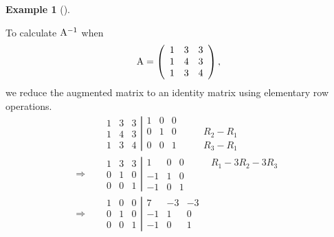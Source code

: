 \documentclass[
  a4paper,
  DIV=11,
  numbers=noendperiod,
  oneside]{scrreprt}
\theoremstyle{definition}
\newtheorem{example}{Example}[chapter]
\theoremstyle{remark}
\begin{document}
\begin{example}[]\protect\hypertarget{exm-inv}{}\label{exm-inv}

To calculate \({\rm A}^{-1}\) when \[{\rm A} =\left( \begin{array}{rrr}
 1  & 3  & 3  \\
 1  & 4  & 3  \\
 1  & 3  & 4  
\end{array} \right),\] we reduce the augmented matrix to an identity
matrix using elementary row operations. \[\begin{aligned}
& \left. \begin{array}{rrr}
 1  & 3  & 3  \\
 1  & 4  & 3  \\
 1  & 3 & 4  
\end{array}  \right| \begin{array}{rrrr}
 1  & 0  & 0  & \qquad  \\
 0  & 1  & 0  & \qquad R_{2} - R_{1}\\
 0  & 0  & 1  & \qquad R_{3} - R_{1}
\end{array} \\
\Rightarrow \quad  &\left. \begin{array}{rrr}
 1  & 3  & 3  \\
 0  & 1  & 0  \\
 0 & 0 & 1 
\end{array}  \right| \begin{array}{rrrr}
 1  & 0  & 0  & \qquad R_{1} - 3 R_{2}- 3R_{3}\\
 -1  & 1  & 0  & \qquad \\
 -1  & 0  & 1  & \qquad 
\end{array}\\
\Rightarrow \quad  &\left. \begin{array}{rrr}
 1  & 0  & 0  \\
 0  & 1  & 0  \\
 0 & 0 & 1 
\end{array}  \right| \begin{array}{rrrr}
 7  & -3  & -3  & \qquad  \\
 -1  & 1  & 0  & \qquad \\
 -1  & 0  & 1  & \qquad 
\end{array} 
\end{aligned}\]

\end{example}
\end{document}
